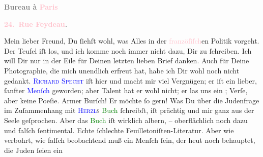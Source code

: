            \begin{otherlanguage}{french}\textcolor{gray}{\textbf{\textbf{Bureau à \textcolor{pink}{Paris}{}\ledrightnote{\textcolor{pink}{Paris}}}}}\end{otherlanguage}\pend
           \pstart
           \begin{otherlanguage}{french}\textcolor{gray}{\textbf{\textbf{\textcolor{pink}{24. Rue Feydeau}{}\ledrightnote{\textcolor{pink}{rue Feydeau}}.}}}\end{otherlanguage}\pend
           \pstart\center{}Mein lieber Freund,\pend\pstart
           Du ſiehſt wohl, was Alles in der \textcolor{pink}{franzöſiſch}{}en Politik vorgeht. Der Teufel iſt los, und ich komme noch immer
               nicht dazu, Dir zu ſchreiben. Ich will Dir nur in der Eile für Deinen letzten lieben
               Brief danken. Auch für Deine Photographie, die mich unendlich erfreut hat, habe ich
               Dir wohl noch nicht gedankt. \textsc{\textcolor{blue}{Richard Specht}{}\ledrightnote{\textcolor{blue}{Richard Specht}}} iſt hier und macht mir viel Vergnügen; er iſt ein lieber, ſanfter \textcolor{blue}{Menſch}{} geworden; aber Talent
               hat er wohl nicht; er las uns ein \label{K_L02769-99v}\label{K_L02769-99h}; Verſe, aber
               keine Poeſie. Armer Burſch! Er möchte ſo gern!\pend
           \pstart
           {\pb}Was Du über die Judenfrage im Zuſammenhang mit \textsc{\textcolor{blue}{Herzl}{}\ledrightnote{\textcolor{blue}{Theodor Herzl}}s}{ }\textcolor{green}{Buch}{} ſchreibſt, iſt prächtig
               und mir ganz aus der Seele geſprochen. Aber das \textcolor{green}{Buch}{} iſt wirklich albern, – oberflächlich noch dazu und
               falſch ſentimental. Echte ſchlechte Feuilletoniſten-Literatur. Aber wie verbohrt, wie
               falſch beobachtend muß ein Menſch ſein, der heut noch behauptet, die Juden ſeien ein
